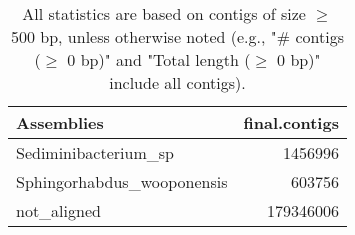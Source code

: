 \documentclass[12pt,a4paper]{article}
\begin{document}
\begin{table}[ht]
\begin{center}
\caption{All statistics are based on contigs of size $\geq$ 500 bp, unless otherwise noted (e.g., "\# contigs ($\geq$ 0 bp)" and "Total length ($\geq$ 0 bp)" include all contigs).}
\begin{tabular}{|l*{1}{|r}|}
\hline
Assemblies & final.contigs \\ \hline
Sediminibacterium\_sp & 1456996 \\ \hline
Sphingorhabdus\_wooponensis & 603756 \\ \hline
not\_aligned & 179346006 \\ \hline
\end{tabular}
\end{center}
\end{table}
\end{document}
